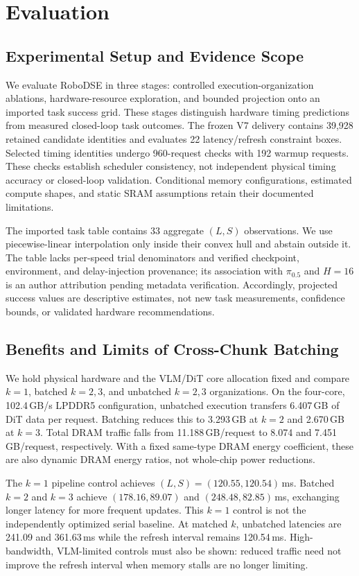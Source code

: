 \section{Evaluation}
\label{sec:eval}

\subsection{Experimental Setup and Evidence Scope}
We evaluate RoboDSE in three stages: controlled execution-organization ablations,
hardware-resource exploration, and bounded projection onto an imported task
success grid. These stages distinguish hardware timing predictions from measured
closed-loop task outcomes. The frozen V7 delivery contains 39,928 retained
candidate identities and evaluates 22 latency/refresh constraint boxes.
Selected timing identities undergo 960-request checks with 192 warmup requests.
These checks establish scheduler consistency, not independent physical timing
accuracy or closed-loop validation. Conditional memory configurations, estimated
compute shapes, and static SRAM assumptions retain their documented limitations.

The imported task table contains 33 aggregate $(L,S)$ observations. We use
piecewise-linear interpolation only inside their convex hull and abstain outside
it. The table lacks per-speed trial denominators and verified checkpoint,
environment, and delay-injection provenance; its association with
$\pi_{0.5}$ and $H=16$ is an author attribution pending metadata verification.
Accordingly, projected success values are descriptive estimates, not new task
measurements, confidence bounds, or validated hardware recommendations.

\subsection{Benefits and Limits of Cross-Chunk Batching}
We hold physical hardware and the VLM/DiT core allocation fixed and compare
$k=1$, batched $k=2,3$, and unbatched $k=2,3$ organizations.
On the four-core, 102.4\,GB/s LPDDR5 configuration, unbatched execution transfers
6.407\,GB of DiT data per request. Batching reduces this to 3.293\,GB at $k=2$
and 2.670\,GB at $k=3$. Total DRAM traffic falls from 11.188\,GB/request to
8.074 and 7.451\,GB/request, respectively. With a fixed same-type DRAM energy
coefficient, these are also dynamic DRAM energy ratios, not whole-chip power
reductions.

The $k=1$ pipeline control achieves $(L,S)=(120.55,120.54)$\,ms. Batched $k=2$
and $k=3$ achieve $(178.16,89.07)$ and $(248.48,82.85)$\,ms, exchanging longer
latency for more frequent updates. This $k=1$ control is not the independently
optimized serial baseline. At matched $k$, unbatched latencies are 241.09 and
361.63\,ms while the refresh interval remains 120.54\,ms. High-bandwidth,
VLM-limited controls must also be shown: reduced traffic need not improve the
refresh interval when memory stalls are no longer limiting.

